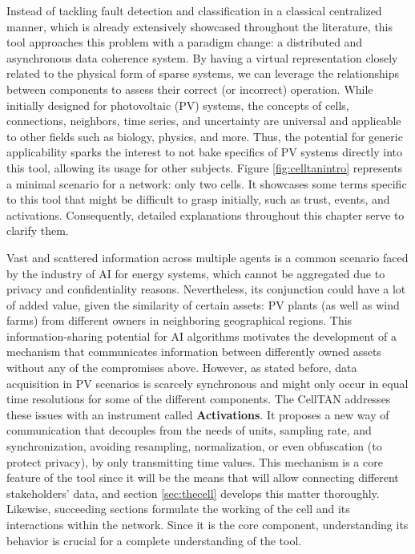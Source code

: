 Instead of tackling fault detection and classification in a classical centralized manner, which is already extensively showcased throughout the literature, this tool approaches this problem with a paradigm change: a distributed and asynchronous data coherence system. By having a virtual representation closely related to the physical form of sparse systems, we can leverage the relationships between components to assess their correct (or incorrect) operation. While initially designed for photovoltaic (PV) systems, the concepts of cells, connections, neighbors, time series, and uncertainty are universal and applicable to other fields such as biology, physics, and more. Thus, the potential for generic applicability sparks the interest to not bake specifics of PV systems directly into this tool, allowing its usage for other subjects. Figure \ref{fig:celltanintro} represents a minimal scenario for a network: only two cells. It showcases some terms specific to this tool that might be difficult to grasp initially, such as trust, events, and activations. Consequently, detailed explanations throughout this chapter serve to clarify them.

Vast and scattered information across multiple agents is a common scenario faced by the industry of AI for energy systems, which cannot be aggregated due to privacy and confidentiality reasons. Nevertheless, its conjunction could have a lot of added value, given the similarity of certain assets: PV plants (as well as wind farms) from different owners in neighboring geographical regions. This information-sharing potential for AI algorithms motivates the development of a mechanism that communicates information between differently owned assets without any of the compromises above. However, as stated before, data acquisition in PV scenarios is scarcely synchronous and might only occur in equal time resolutions for some of the different components. The CellTAN addresses these issues with an instrument called \textbf{Activations}. It proposes a new way of communication that decouples from the needs of units, sampling rate, and synchronization, avoiding resampling, normalization, or even obfuscation (to protect privacy), by only transmitting time values. This mechanism is a core feature of the tool since it will be the means that will allow connecting different stakeholders' data, and section \ref{sec:thecell} develops this matter thoroughly. Likewise, succeeding sections formulate the working of the cell and its interactions within the network. Since it is the core component, understanding its behavior is crucial for a complete understanding of the tool.

